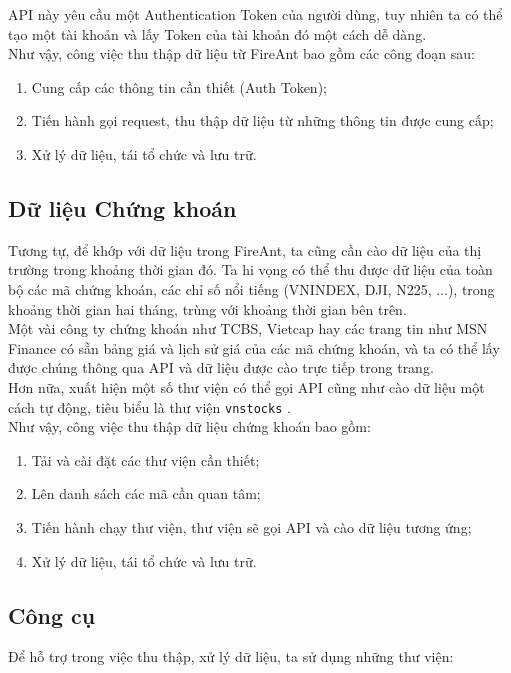 API này yêu cầu một Authentication Token của người dùng, tuy nhiên ta có thể tạo một tài khoản và lấy Token của tài khoản đó một cách dễ dàng.\\

Như vậy, công việc thu thập dữ liệu từ FireAnt bao gồm các công đoạn sau:

\begin{enumerate}
    \item Cung cấp các thông tin cần thiết (Auth Token);
    \item Tiến hành gọi request, thu thập dữ liệu từ những thông tin được cung cấp;
    \item Xử lý dữ liệu, tái tổ chức và lưu trữ.
\end{enumerate}

\subsection{Dữ liệu Chứng khoán}
Tương tự, để khớp với dữ liệu trong FireAnt, ta cũng cần cào dữ liệu của thị trường trong khoảng thời gian đó. Ta hi vọng có thể thu được dữ liệu của toàn bộ các mã chứng khoán, các chỉ số nổi tiếng (VNINDEX, DJI, N225, ...), trong khoảng thời gian hai tháng, trùng với khoảng thời gian bên trên.\\

Một vài công ty chứng khoán như TCBS, Vietcap hay các trang tin như MSN Finance có sẵn bảng giá và lịch sử giá của các mã chứng khoán, và ta có thể lấy được chúng thông qua API và dữ liệu được cào trực tiếp trong trang.\\

Hơn nữa, xuất hiện một số thư viện có thể gọi API cũng như cào dữ liệu một cách tự động, tiêu biểu là thư viện \texttt{vnstocks} \cite{vnstocks}.\\

Như vậy, công việc thu thập dữ liệu chứng khoán bao gồm:

\begin{enumerate}
    \item Tải và cài đặt các thư viện cần thiết;
    \item Lên danh sách các mã cần quan tâm;
    \item Tiến hành chạy thư viện, thư viện sẽ gọi API và cào dữ liệu tương ứng;
    \item Xử lý dữ liệu, tái tổ chức và lưu trữ.
\end{enumerate}

\subsection{Công cụ}
Để hỗ trợ trong việc thu thập, xử lý dữ liệu, ta sử dụng những thư viện:

